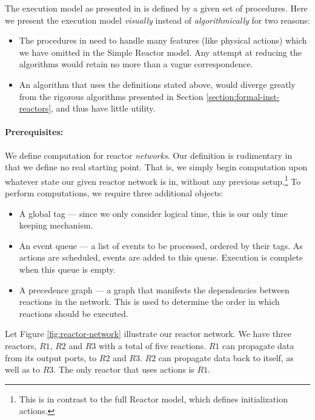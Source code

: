 The execution model as presented in \cite{cyphy} is defined by a given set of procedures.
Here we present the execution model \emph{visually} instead of \emph{algorithmically} for two reasons:

\begin{itemize}
    \item The procedures in \cite{cyphy} need to handle many features (like physical actions) which we have omitted in the Simple Reactor model.
    Any attempt at reducing the algorithms would retain no more than a vague correspondence. 
    \item An algorithm that uses the definitions stated above, would diverge greatly from the rigorous algorithms presented in Section \ref{section:formal-inst-reactors}, and thus have little utility.
\end{itemize}

\paragraph{Prerequisites:}

We define computation for reactor \emph{networks}.
Our definition is rudimentary in that we define no real starting point.
That is, we simply begin computation upon whatever state our given reactor network is in, without any previous setup.\footnote{
    This is in contrast to the full Reactor model, which defines initialization actions.
}
To perform computations, we require three additional objects:
\break

\begin{itemize}
    \item A global tag --- since we only consider logical time, this is our only time keeping mechanism.
    \item An event queue --- a list of events to be processed, ordered by their tags.
    As actions are scheduled, events are added to this queue.
    Execution is complete when this queue is empty.
    \item A precedence graph --- a graph that manifests the dependencies between reactions in the network.
    This is used to determine the order in which reactions should be executed.
\end{itemize}

\noindent Let Figure \ref{fig:reactor-network} illustrate our reactor network.
We have three reactors, $R1$, $R2$ and $R3$ with a total of five reactions.
$R1$ can propagate data from its output ports, to $R2$ and $R3$.
$R2$ can propagate data back to itself, as well as to $R3$.
The only reactor that uses actions is $R1$.

